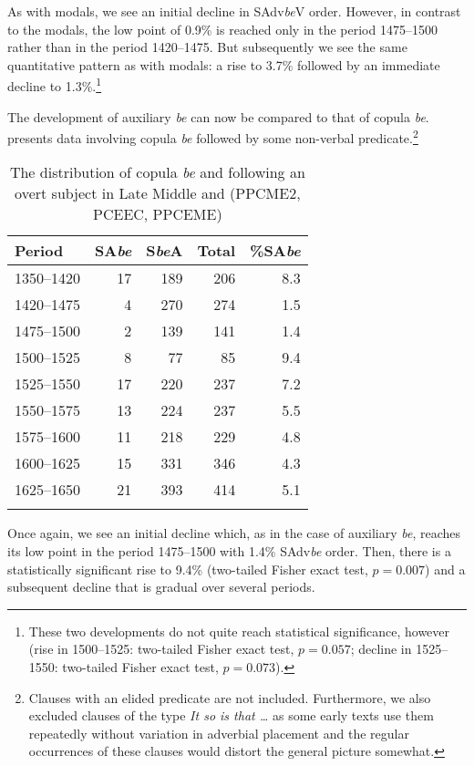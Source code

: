 \documentclass[output=paper]{langsci/langscibook}
\begin{document}
As with modals, we see an initial decline in SAdv\emph{be}V order. However,
in contrast to the modals, the low point of 0.9\% is reached only in the period
1475--1500 rather than in the period 1420--1475. But subsequently we see the same
quantitative pattern as with modals: a rise to 3.7\% followed by an immediate
decline to 1.3\%.\footnote{These two developments do not quite reach
statistical significance, however (rise in 1500--1525: two-tailed Fisher exact
test, $p = 0.057$; decline in 1525--1550: two-tailed Fisher exact test, $p =
0.073$).}\largerpage

The development of auxiliary \emph{be} can now be compared to that of copula
\emph{be}.  presents data involving copula \emph{be}
followed by some non-verbal {predicate}.{\footnote{Clauses with an elided
    predicate are not included. Furthermore, we also excluded clauses of the
type \emph{It so is that …} as some early texts use them repeatedly without
variation in adverbial placement and the regular occurrences of these clauses
would distort the general picture somewhat.}}\newpage

\begin{table}
\caption{The distribution of copula \emph{be} and  following an overt
subject in Late Middle and  (PPCME2, PCEEC,
PPCEME)\label{tab:key:09.3}}
\begin{tabular}{lrrrr}
\lsptoprule
{Period} & {SA\emph{be}} & {S\emph{be}A} & {Total} & {\%SA\emph{be}}\\
\midrule
1350--1420 & 17 & 189 & 206 & 8.3\\
1420--1475 & 4 & 270 & 274 & 1.5\\
1475--1500 & 2 & 139 & 141 & 1.4\\
1500--1525 & 8 & 77 & 85 & 9.4\\
1525--1550 & 17 & 220 & 237 & 7.2\\
1550--1575 & 13 & 224 & 237 & 5.5\\
1575--1600 & 11 & 218 & 229 & 4.8\\
1600--1625 & 15 & 331 & 346 & 4.3\\
1625--1650 & 21 & 393 & 414 & 5.1\\
\lspbottomrule
\end{tabular}
\end{table}

Once again, we see an initial decline which, as in the case of auxiliary
\emph{be}, reaches its low point in the period 1475--1500 with 1.4\%
SAdv\emph{be} order. Then, there is a statistically significant rise to 9.4\%
(two-tailed Fisher exact test, $p = 0.007$) and a subsequent decline that is
gradual over several periods.
\end{document}

